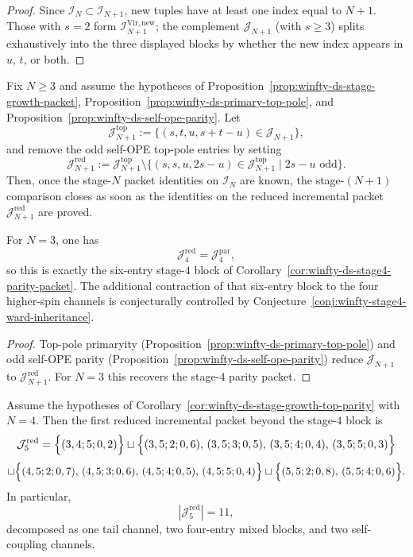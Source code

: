\begin{proof}
Since $\mathcal{I}_N\subset \mathcal{I}_{N+1}$, new tuples have at least one index equal to $N{+}1$.  Those with $s=2$ form $\mathcal{I}_{N+1}^{\mathrm{Vir,new}}$; the complement $\mathcal{J}_{N+1}$ (with $s\geq 3$) splits exhaustively into the three displayed blocks by whether the new index appears in $u$, $t$, or both.
\end{proof}

\begin{corollary}
\label{cor:winfty-ds-stage-growth-top-parity}
Fix $N \ge 3$ and assume the hypotheses of
Proposition~\ref{prop:winfty-ds-stage-growth-packet},
Proposition~\ref{prop:winfty-ds-primary-top-pole}, and
Proposition~\ref{prop:winfty-ds-self-ope-parity}.  Let
\[
\mathcal{J}_{N+1}^{\mathrm{top}}
:=
\{(s,t,u,s+t-u)\in \mathcal{J}_{N+1}\},
\]
and remove the odd self-OPE top-pole entries by setting
\[
\mathcal{J}_{N+1}^{\mathrm{red}}
:=
\mathcal{J}_{N+1}^{\mathrm{top}}
\setminus
\bigl\{(s,s,u,2s-u)\in\mathcal{J}_{N+1}^{\mathrm{top}}
\mid 2s-u \text{ odd}\bigr\}.
\]
Then, once the stage-$N$ packet identities on $\mathcal{I}_N$ are
known, the stage-$(N+1)$ comparison closes as soon as the identities on
the reduced incremental packet
$\mathcal{J}_{N+1}^{\mathrm{red}}$ are proved.

For $N=3$, one has
\[
\mathcal{J}_4^{\mathrm{red}}
=
\mathcal{J}_4^{\mathrm{par}},
\]
so this is exactly the six-entry stage-$4$ block of
Corollary~\ref{cor:winfty-ds-stage4-parity-packet}.  The additional
contraction of that six-entry block to the four higher-spin channels is
conjecturally controlled by
Conjecture~\ref{conj:winfty-stage4-ward-inheritance}.
\end{corollary}

\begin{proof}
Top-pole primaryity (Proposition~\ref{prop:winfty-ds-primary-top-pole}) and odd self-OPE parity (Proposition~\ref{prop:winfty-ds-self-ope-parity}) reduce $\mathcal{J}_{N+1}$ to $\mathcal{J}_{N+1}^{\mathrm{red}}$.  For $N=3$ this recovers the stage-$4$ parity packet.
\end{proof}

\begin{corollary}
\label{cor:winfty-ds-stage5-reduced-packet}
Assume the hypotheses of
Corollary~\ref{cor:winfty-ds-stage-growth-top-parity} with $N=4$.
Then the first reduced incremental packet beyond the stage-$4$ block is
\[
\mathcal{J}_5^{\mathrm{red}}
=
\Bigl\{
(3,4;5;0,2)
\Bigr\}
\sqcup
\Bigl\{
(3,5;2;0,6),\,
(3,5;3;0,5),\,
(3,5;4;0,4),\,
(3,5;5;0,3)
\Bigr\}
\]
\[
\sqcup
\Bigl\{
(4,5;2;0,7),\,
(4,5;3;0,6),\,
(4,5;4;0,5),\,
(4,5;5;0,4)
\Bigr\}
\sqcup
\Bigl\{
(5,5;2;0,8),\,
(5,5;4;0,6)
\Bigr\}.
\]
In particular,
\[
|\mathcal{J}_5^{\mathrm{red}}|=11,
\]
decomposed as one tail channel, two four-entry mixed blocks, and two
self-coupling channels.
\end{corollary}

